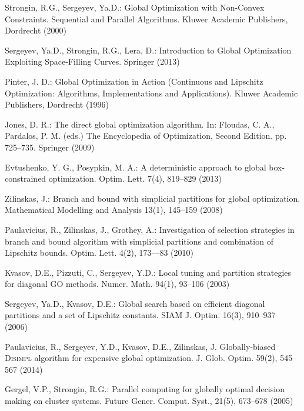 \documentclass[smallcondensed]{svjour3}     %
\begin{document}
\begin{thebibliography}{}

Strongin, R.G., Sergeyev, Ya.D.: Global Optimization with Non-Convex Constraints. Sequential and Parallel Algorithms. Kluwer Academic Publishers, Dordrecht (2000)

Sergeyev, Ya.D., Strongin, R.G., Lera, D.: Introduction to Global Optimization Exploiting Space-Filling Curves. Springer (2013)

Pinter, J. D.: Global Optimization in Action (Continuous and Lipschitz Optimization: Algorithms, Implementations and Applications). Kluwer Academic Publishers, Dordrecht (1996)

Jones, D. R.: The direct global optimization algorithm. In: Floudas, C. A., Pardalos, P. M. (eds.) The Encyclopedia of Optimization, Second Edition. pp. 725--735. Springer (2009)

Evtushenko, Y. G., Posypkin, M. A.: A deterministic approach to global box-constrained optimization. Optim. Lett. 7(4), 819--829 (2013)

Zilinskas, J.: Branch and bound with simplicial partitions for global optimization. Mathematical Modelling and Analysis 13(1), 145--159 (2008)

Paulavicius, R., Zilinskas, J., Grothey, A.: Investigation of selection strategies in branch and bound algorithm with simplicial partitions and combination of Lipschitz bounds. Optim. Lett. 4(2), 173–--83 (2010)

Kvasov, D.E., Pizzuti, C., Sergeyev, Y.D.: Local tuning and partition strategies for diagonal GO methods. Numer. Math. 94(1), 93--106 (2003)

Sergeyev, Ya.D., Kvasov, D.E.: Global search based on efficient diagonal partitions and a set of Lipschitz constants. SIAM J. Optim. 16(3), 910--937 (2006)

Paulavicius, R., Sergeyev, Y.D., Kvasov, D.E., Zilinskas, J. Globally-biased \textsc{Disimpl} algorithm for expensive global optimization. J. Glob. Optim. 59(2), 545--567 (2014)

Gergel, V.P., Strongin, R.G.: Parallel computing for globally optimal decision making on cluster systems. Future Gener. Comput. Syst., 21(5), 673--678 (2005)


\end{thebibliography}
\end{document}
